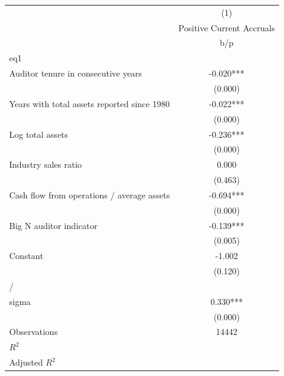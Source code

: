 {
\def\sym#1{\ifmmode^{#1}\else\(^{#1}\)\fi}
\begin{tabular}{l*{1}{c}}
\hline\hline
                    &\multicolumn{1}{c}{(1)}\\
                    &\multicolumn{1}{c}{Positive Current Accruals}\\
                    &         b/p   \\
\hline
eq1                 &               \\
Auditor tenure in consecutive years&      -0.020***\\
                    &     (0.000)   \\
Years with total assets reported since 1980&      -0.022***\\
                    &     (0.000)   \\
Log total assets    &      -0.236***\\
                    &     (0.000)   \\
Industry sales ratio&       0.000   \\
                    &     (0.463)   \\
Cash flow from operations / average assets&      -0.694***\\
                    &     (0.000)   \\
Big N auditor indicator&      -0.139***\\
                    &     (0.005)   \\
Constant            &      -1.002   \\
                    &     (0.120)   \\
\hline
/                   &               \\
sigma               &       0.330***\\
                    &     (0.000)   \\
\hline
Observations        &       14442   \\
\(R^{2}\)           &               \\
Adjusted \(R^{2}\)  &               \\
\hline\hline
\end{tabular}
}
